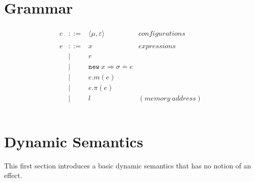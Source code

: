 \documentclass{llncs}
\newcommand{\keywadj}[1]{\mathtt{#1}}
\newcommand{\config}[1] { \langle #1 \rangle }
\begin{document}
\section{Grammar}


\[
\begin{array}{lll}
\begin{array}{lllr}

	c & ::= & \config{\mu, \varepsilon} & configurations \\
	&&\\

	e & ::= & x & expressions \\
  		& | & r \\
  		& | & \keywadj{new}~x \Rightarrow \overline{\sigma = e} \\
  		& | & e.m(e)\\
  		& | & e.\pi(e)\\
		& | & l & (memory~address) \\
		&&\\

\end{array}
\end{array}
\]



\section{Dynamic Semantics}

This first section introduces a basic dynamic semantics that has no notion of an effect.
\\

\fbox{$\config{\mu, \Sigma, e} \longrightarrow \config{\mu, \Sigma, e}$}
\end{document}
